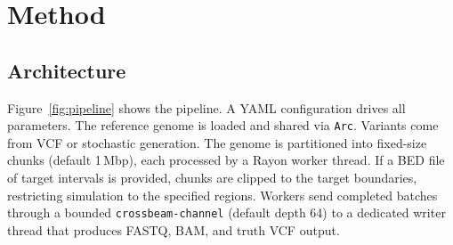 \section{Method}
\label{sec:method}

\subsection{Architecture}

Figure~\ref{fig:pipeline} shows the pipeline.
A YAML configuration drives all parameters.
The reference genome is loaded and shared via \texttt{Arc}.
Variants come from VCF or stochastic generation.
The genome is partitioned into fixed-size chunks (default 1\,Mbp), each processed by a Rayon\autocite{rayon} worker thread.
If a BED file of target intervals is provided, chunks are clipped to the target boundaries, restricting simulation to the specified regions.
Workers send completed batches through a bounded \texttt{crossbeam-channel} (default depth 64) to a dedicated writer thread that produces FASTQ, BAM, and truth VCF output.

